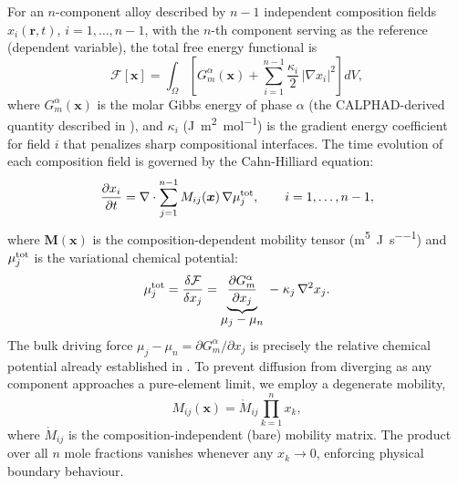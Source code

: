 For an $n$-component alloy described by $n-1$ independent composition
fields $x_i(\boldsymbol{r},t)$, $i=1,\ldots,n-1$, with the $n$-th
component serving as the reference (dependent variable), the total
free energy functional is
%
\begin{equation}\label{eq:pf_functional}
    \mathcal{F}[\boldsymbol{x}]
    = \int_\Omega \left[
        G^\alpha_m(\boldsymbol{x})
        + \sum_{i=1}^{n-1} \frac{\kappa_i}{2}\,\bigl|\nabla x_i\bigr|^2
      \right] dV,
\end{equation}
%
where $G^\alpha_m(\boldsymbol{x})$ is the molar Gibbs energy of phase
$\alpha$ (the CALPHAD-derived quantity described in
), and $\kappa_i$
(\si{\joule\metre\squared\per\mol}) is the gradient energy
coefficient for field $i$ that penalizes sharp compositional
interfaces.  The time evolution of each composition field is governed
by the Cahn-Hilliard equation:
%
\begin{equation}\label{eq:CH_multicomp}
    \frac{\partial x_i}{\partial t}
    = \nabla \cdot \sum_{j=1}^{n-1} M_{ij}(\boldsymbol{x})\,
      \nabla \mu_j^{\rm tot},
    \qquad i = 1,\ldots,n-1,
\end{equation}
%
where $\boldsymbol{M}(\boldsymbol{x})$ is the composition-dependent
mobility tensor (\si{\metre\tothe{5}\per\joule\per\second}) and
$\mu_j^{\rm tot}$ is the variational chemical potential:
%
\begin{equation}\label{eq:mu_var_pf}
    \mu_j^{\rm tot}
    = \frac{\delta\mathcal{F}}{\delta x_j}
    = \underbrace{\frac{\partial G^\alpha_m}{\partial x_j}}_{\textstyle\mu_j - \mu_n}
      \;-\; \kappa_j\,\nabla^2 x_j.
\end{equation}
%
The bulk driving force $\mu_j - \mu_n = \partial G^\alpha_m/\partial x_j$
is precisely the relative chemical potential already established in
.  To prevent diffusion from diverging
as any component approaches a pure-element limit, we employ a
degenerate mobility,
%
\begin{equation}\label{eq:mobility_pf}
    M_{ij}(\boldsymbol{x}) = \mathring{M}_{ij}\prod_{k=1}^{n} x_k,
\end{equation}
%
where $\mathring{M}_{ij}$ is the composition-independent (bare)
mobility matrix.  The product over all $n$ mole fractions vanishes
whenever any $x_k \to 0$, enforcing physical boundary behaviour.

